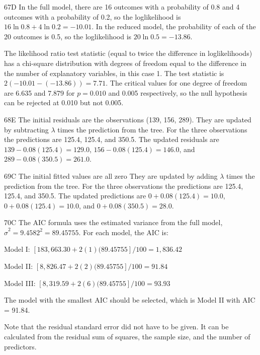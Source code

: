 \begin{solution}{67}{D}
In the full model, there are 16 outcomes with a probability of 0.8 and 4 outcomes with a probability of 0.2, so the loglikelihood is $16 \ln 0.8 + 4 \ln 0.2 = -10.01$. In the reduced model, the probability of each of the 20 outcomes is 0.5, so the loglikelihood is $20 \ln 0.5 = -13.86$.

The likelihood ratio test statistic (equal to twice the difference in loglikelihoods) has a chi-square distribution with degrees of freedom equal to the difference in the number of explanatory variables, in this case 1. The test statistic is $2(-10.01 - (-13.86)) = 7.71$. The critical values for one degree of freedom are 6.635 and 7.879 for $p = 0.010$ and 0.005 respectively, so the null hypothesis can be rejected at 0.010 but not 0.005.
\end{solution}

\begin{solution}{68}{E}
The initial residuals are the observations (139, 156, 289). They are updated by subtracting $\lambda$ times the prediction from the tree. For the three observations the predictions are 125.4, 125.4, and 350.5. The updated residuals are $139 - 0.08(125.4) = 129.0$, $156 - 0.08(125.4) = 146.0$, and $289 - 0.08(350.5) = 261.0$.
\end{solution}

\begin{solution}{69}{C}
The initial fitted values are all zero They are updated by adding $\lambda$ times the prediction from the tree. For the three observations the predictions are 125.4, 125.4, and 350.5. The updated predictions are $0 + 0.08(125.4) = 10.0$, $0 + 0.08(125.4) = 10.0$, and $0 + 0.08(350.5) = 28.0$.
\end{solution}

\begin{solution}{70}{C}
The AIC formula uses the estimated variance from the full model, $\hat{\sigma}^2 = 9.4582^2 = 89.45755$. For each model, the AIC is:

Model I: $[183{,}663.30 + 2(1)(89.45755]/100 = 1{,}836.42$

Model II: $[8{,}826.47 + 2(2)(89.45755]/100 = 91.84$

Model III: $[8{,}319.59 + 2(6)(89.45755]/100 = 93.93$

The model with the smallest AIC should be selected, which is Model II with AIC = 91.84.

Note that the residual standard error did not have to be given. It can be calculated from the residual sum of squares, the sample size, and the number of predictors.
\end{solution}

